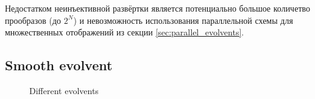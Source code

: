 \documentclass[runningheads]{llncs}
\begin{document}

Недостатком неинъективной развёртки является потенциально большое количетво прообразов (до $2^N$) и невозможность использования параллельной схемы для множественных отображений из секции \ref{sec:parallel_evolvents}.

\subsection{Smooth evolvent}


\begin{figure}[ht]
    \centering
    \caption{Different evolvents}
\end{figure}
\end{document}
